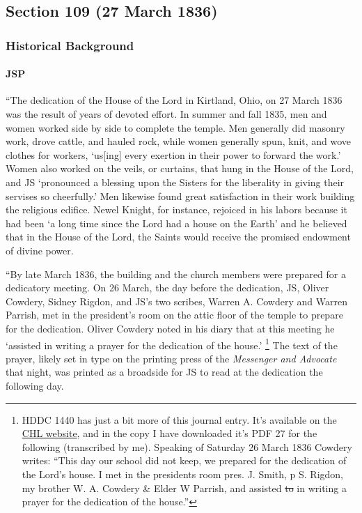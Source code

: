 \subsection{Section 109 (27 March 1836)}
	\label{DC109}
	
	\subsubsection{Historical Background}
		\label{DC109-HB}
		
		\paragraph{JSP}
		
			``The dedication of the House of the Lord in Kirtland, Ohio, on 27 March 1836 was the result of years of devoted effort. In summer and fall 1835, men and women worked side by side to complete the temple. Men generally did masonry work, drove cattle, and hauled rock, while women generally spun, knit, and wove clothes for workers, `us[ing] every exertion in their power to forward the work.' Women also worked on the veils, or curtains, that hung in the House of the Lord, and JS `pronounced a blessing upon the Sisters for the liberality in giving their servises so cheerfully.' Men likewise found great satisfaction in their work building the religious edifice. Newel Knight, for instance, rejoiced in his labors because it had been `a long time since the Lord had a house on the Earth' and he believed that in the House of the Lord, the Saints would receive the promised endowment of divine power.

			``By late March 1836, the building and the church members were prepared for a dedicatory meeting. On 26 March, the day before the dedication, JS, Oliver Cowdery, Sidney Rigdon, and JS's two scribes, Warren A. Cowdery and Warren Parrish, met in the president's room on the attic floor of the temple to prepare for the dedication. Oliver Cowdery noted in his diary that at this meeting he `assisted in writing a prayer for the dedication of the house.'%
				\footnote{%
					HDDC 1440 has just a bit more of this journal entry. It's available on the \href{https://catalog.churchofjesuschrist.org/assets/d11962ee-4618-4177-90aa-aa72cedc0f98/0/0}{CHL website}, and in the copy I have downloaded it's PDF 27 for the following (transcribed by me). Speaking of Saturday 26 March 1836 Cowdery writes: ``This day our school did not keep, we prepared for the dedication of the Lord's house. I met in the presidents room pres. J. Smith, p S. Rigdon, my brother W. A. Cowdery \& Elder W Parrish, and assisted \sout{to} in writing a prayer for the dedication of the house.''
					}
			The text of the prayer, likely set in type on the printing press of the \textit{Messenger and Advocate} that night, was printed as a broadside for JS to read at the dedication the following day.

